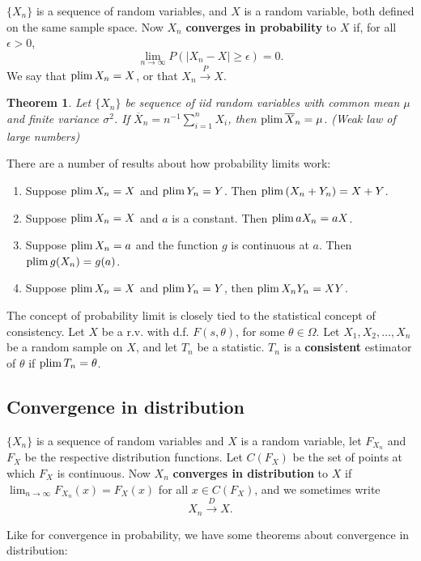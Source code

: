 \documentclass[10pt]{article}
\newtheorem{theorem}{Theorem}%
\begin{document}
$\{X_n\}$ is a sequence of random variables, and $X$ is a random variable, both
defined on the same sample space. Now $X_n$ \textbf{converges in probability} to $X$
if, for all $\epsilon>0$,
\[\lim_{n\rightarrow\infty} P( |X_n-X|\geq \epsilon) = 0.\] We say that
$\operatorname{plim} X_n = X$, or that $X_n \xrightarrow{P} X$.

\begin{theorem}
Let $\{X_n\}$ be sequence of iid random variables with common mean $\mu$ and
finite variance $\sigma^2$. If $\overline{X}_n = n^{-1}\sum_{i=1}^n X_i$, then
$\operatorname{plim} \overline{X}_n=\mu$. (Weak law of large numbers)
\end{theorem}

There are a number of results about how probability limits work:
\begin{enumerate}
\item Suppose $\operatorname{plim} X_n=X$ and $\operatorname{plim} Y_n=Y$. Then $\operatorname{plim} \left(X_n+Y_n\right) = X+Y$.
\item Suppose $\operatorname{plim} X_n=X$ and $a$ is a constant. Then $\operatorname{plim} a X_n = aX$.
\item Suppose $\operatorname{plim} X_n=a$ and the function $g$ is continuous at $a$. Then $\operatorname{plim} g(X_n)=g(a)$.
\item Suppose $\operatorname{plim} X_n=X$ and $\operatorname{plim} Y_n=Y$, then $\operatorname{plim} X_nY_n=XY$.
\end{enumerate}

The concept of probability limit is closely tied to the statistical concept
of consistency. Let $X$ be a r.v. with d.f. $F(s,\theta)$, for some $\theta\in\Omega$.
Let $X_1,X_2,\dots,X_n$ be a random sample on $X$, and let $T_n$ be a statistic.
$T_n$ is a \textbf{consistent} estimator of $\theta$ if $\operatorname{plim} T_n = \theta$.

\subsection{Convergence in distribution}
$\{X_n\}$ is a sequence of random variables and $X$ is a random variable,
let $F_{X_n}$ and $F_X$ be the respective distribution functions. Let 
$C(F_X)$ be the set of points at which $F_X$ is continuous. Now $X_n$ \textbf{converges in
distribution} to $X$ if $\lim_{n\rightarrow\infty} F_{X_n}(x) = F_X(x)$ for all
$x\in C(F_X)$, and we sometimes write \[X_n \xrightarrow{D} X.\]

Like for convergence in probability, we have some theorems about convergence in distribution:
\end{document}
